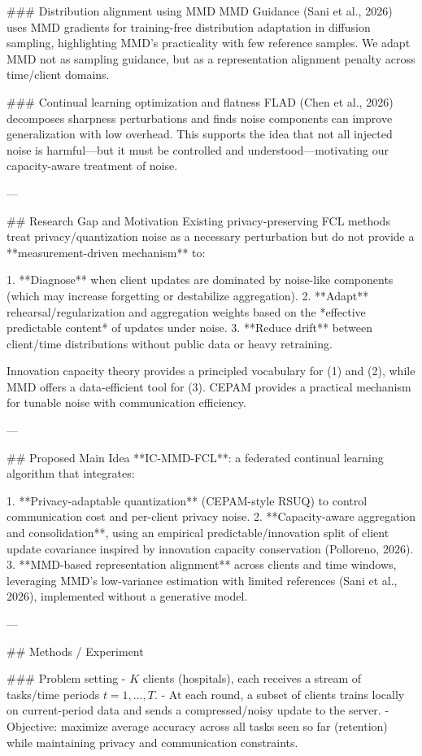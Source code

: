 ### Distribution alignment using MMD  
MMD Guidance (Sani et al., 2026) uses MMD gradients for training-free distribution adaptation in diffusion sampling, highlighting MMD’s practicality with few reference samples. We adapt MMD not as sampling guidance, but as a representation alignment penalty across time/client domains.

### Continual learning optimization and flatness  
FLAD (Chen et al., 2026) decomposes sharpness perturbations and finds noise components can improve generalization with low overhead. This supports the idea that not all injected noise is harmful—but it must be controlled and understood—motivating our capacity-aware treatment of noise.

---

## Research Gap and Motivation  
Existing privacy-preserving FCL methods treat privacy/quantization noise as a necessary perturbation but do not provide a **measurement-driven mechanism** to:  

1. **Diagnose** when client updates are dominated by noise-like components (which may increase forgetting or destabilize aggregation).  
2. **Adapt** rehearsal/regularization and aggregation weights based on the *effective predictable content* of updates under noise.  
3. **Reduce drift** between client/time distributions without public data or heavy retraining.

Innovation capacity theory provides a principled vocabulary for (1) and (2), while MMD offers a data-efficient tool for (3). CEPAM provides a practical mechanism for tunable noise with communication efficiency.

---

## Proposed Main Idea  
**IC-MMD-FCL**: a federated continual learning algorithm that integrates:

1. **Privacy-adaptable quantization** (CEPAM-style RSUQ) to control communication cost and per-client privacy noise.  
2. **Capacity-aware aggregation and consolidation**, using an empirical predictable/innovation split of client update covariance inspired by innovation capacity conservation (Polloreno, 2026).  
3. **MMD-based representation alignment** across clients and time windows, leveraging MMD’s low-variance estimation with limited references (Sani et al., 2026), implemented without a generative model.

---

## Methods / Experiment  

### Problem setting  
- \(K\) clients (hospitals), each receives a stream of tasks/time periods \(t=1,\dots,T\).  
- At each round, a subset of clients trains locally on current-period data and sends a compressed/noisy update to the server.  
- Objective: maximize average accuracy across all tasks seen so far (retention) while maintaining privacy and communication constraints.

